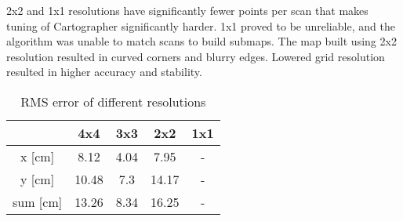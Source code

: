 \documentclass[conference]{IEEEtran}
\begin{document}
2x2 and 1x1 resolutions have significantly fewer points per scan that makes tuning of Cartographer significantly 
harder. 1x1 proved to be unreliable, and the algorithm was unable to match scans to build submaps. 
The map built using 2x2 resolution resulted in curved corners and blurry edges. Lowered grid resolution 
resulted in higher accuracy and stability.

\begin{table}[!t]
\renewcommand{\arraystretch}{1.3}
\caption{RMS error of different resolutions}
\label{table_resolution}
\centering
\begin{tabular}{|c||c|c|c|c|}
\hline
  & 4x4 & 3x3 & 2x2 & 1x1\\
\hline
\hline
x [cm] & 8.12 & 4.04 & 7.95 & -\\
\hline
y [cm]& 10.48 & 7.3& 14.17& -\\
\hline
sum [cm]& 13.26 & 8.34 & 16.25& -\\
\hline
\end{tabular}
\end{table}







\end{document}

